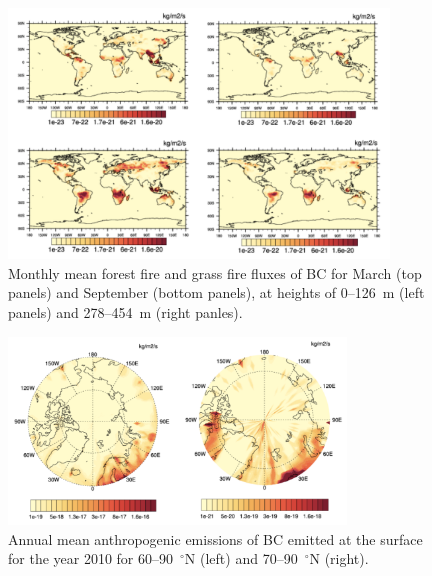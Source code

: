 \documentclass[12pt, fullpage]{uiucthesis2009}
\begin{document}
	\begin{figure}[h] 
		\begin{center}
			\includegraphics[width = 0.9\textwidth]{Figure12}
			\caption[Monthly mean forest fire and grass fire fluxes of BC for March (top panels) and September (bottom panels), at heights of 0--126~m (left panels) and 278--454~m (right panles)]{\label{fig_P12} Monthly mean forest fire and grass fire fluxes of BC for March (top panels) and September (bottom panels), at heights of 0--126~m (left panels) and 278--454~m (right panles).}
		\end{center}
	\end{figure}
	
	\begin{figure}[h] 
		\begin{center}
			\includegraphics[width = 0.8\textwidth]{Figure11}
			\caption[Annual mean anthropogenic emissions of BC emitted at the surface for the year 2010 for 60--90~$^\circ$N (left) and 70--90~$^\circ$N (right)]{\label{fig_P11} Annual mean anthropogenic emissions of BC emitted at the surface for the year 2010 for 60--90~$^\circ$N (left) and 70--90~$^\circ$N (right).}
		\end{center}
	\end{figure}
	
\end{document}
